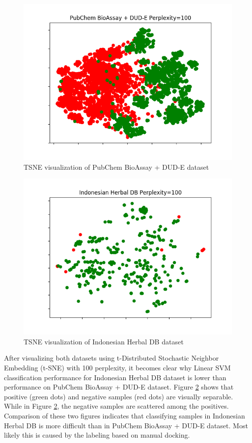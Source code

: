 \documentclass[conference]{IEEEtran}
\begin{document}
\begin{figure}
	\includegraphics[scale=0.5]{../images/visualize-dataset_tsne_pubchem_100.png}
	\caption{TSNE visualization of PubChem BioAssay + DUD-E dataset}
	\label{fig_tsne_pubchem}
\end{figure}

\begin{figure}
	\includegraphics[scale=0.5]{../images/visualize-dataset_tsne_herbaldb_expanded_100.png}
	\caption{TSNE visualization of Indonesian Herbal DB dataset}
	\label{fig_tsne_herbaldb}
\end{figure}	

After visualizing both datasets using t-Distributed Stochastic Neighbor Embedding (t-SNE) \cite{maaten2008visualizing} with 100 perplexity, it becomes clear why Linear SVM classification performance for Indonesian Herbal DB dataset is lower than performance on PubChem BioAssay + DUD-E dataset. Figure \ref{fig_tsne_herbaldb} shows that positive (green dots) and negative samples (red dots) are visually separable. While in Figure \ref{fig_tsne_herbaldb}, the negative samples are scattered among the positives. Comparison of these two figures indicates that classifying samples in Indonesian Herbal DB is more difficult than in PubChem BioAssay + DUD-E dataset. Most likely this is caused by the labeling based on manual docking.
\end{document}
